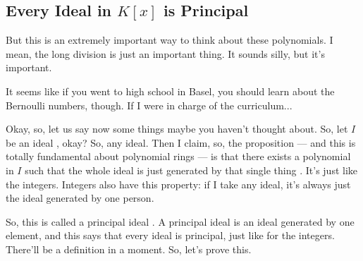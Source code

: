 \subsection{Every Ideal in \texorpdfstring{$K[x]$}{K[x]} is Principal}

\begin{speech}[00:32:21 - 00:34:09]
But this is an extremely important way to think about these polynomials. I mean, the long division is just an important thing. It sounds silly, but it's important.

It seems like if you went to high school in Basel, you should learn about the Bernoulli numbers, though. If I were in charge of the curriculum... 

Okay, so, let us say now some things maybe you haven't thought about. So, let $I$ be an ideal , okay? So, any ideal. Then I claim, so, the proposition --- and this is totally fundamental about polynomial rings --- is that there exists a polynomial in $I$  such that the whole ideal is just generated by that single thing . It's just like the integers. Integers also have this property: if I take any ideal, it's always just the ideal generated by one person.

So, this is called a principal ideal . A principal ideal is an ideal generated by one element, and this says that every ideal is principal, just like for the integers. There'll be a definition in a moment. So, let's prove this.
\end{speech}

\begin{content}
\end{content}

